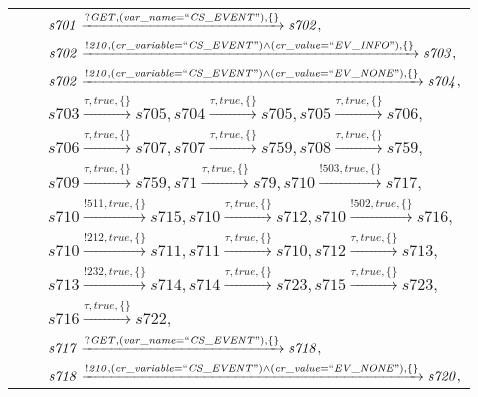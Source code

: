 \begin{tabular}{lcp{350px}}
& & $\mathit{s701}\xrightarrow{\mathit{?GET}, \mathit{(var\_name = ``CS\_EVENT")}, \{\}}\mathit{s702},$ \\
& & $\mathit{s702}\xrightarrow{\mathit{!210}, \mathit{(cr\_variable = ``CS\_EVENT") \land (cr\_value = ``EV\_INFO")}, \{\}}\mathit{s703},$ \\
& & $\mathit{s702}\xrightarrow{\mathit{!210}, \mathit{(cr\_variable = ``CS\_EVENT") \land (cr\_value = ``EV\_NONE")}, \{\}}\mathit{s704},$ \\
& & $\mathit{s703}\xrightarrow{\mathit{\tau}, \mathit{true}, \{\}}\mathit{s705},\mathit{s704}\xrightarrow{\mathit{\tau}, \mathit{true}, \{\}}\mathit{s705},\mathit{s705}\xrightarrow{\mathit{\tau}, \mathit{true}, \{\}}\mathit{s706},$ \\
& & $\mathit{s706}\xrightarrow{\mathit{\tau}, \mathit{true}, \{\}}\mathit{s707},\mathit{s707}\xrightarrow{\mathit{\tau}, \mathit{true}, \{\}}\mathit{s759},\mathit{s708}\xrightarrow{\mathit{\tau}, \mathit{true}, \{\}}\mathit{s759},$ \\
& & $\mathit{s709}\xrightarrow{\mathit{\tau}, \mathit{true}, \{\}}\mathit{s759},\mathit{s71}\xrightarrow{\mathit{\tau}, \mathit{true}, \{\}}\mathit{s79},\mathit{s710}\xrightarrow{\mathit{!503}, \mathit{true}, \{\}}\mathit{s717},$ \\
& & $\mathit{s710}\xrightarrow{\mathit{!511}, \mathit{true}, \{\}}\mathit{s715},\mathit{s710}\xrightarrow{\mathit{\tau}, \mathit{true}, \{\}}\mathit{s712},\mathit{s710}\xrightarrow{\mathit{!502}, \mathit{true}, \{\}}\mathit{s716},$ \\
& & $\mathit{s710}\xrightarrow{\mathit{!212}, \mathit{true}, \{\}}\mathit{s711},\mathit{s711}\xrightarrow{\mathit{\tau}, \mathit{true}, \{\}}\mathit{s710},\mathit{s712}\xrightarrow{\mathit{\tau}, \mathit{true}, \{\}}\mathit{s713},$ \\
& & $\mathit{s713}\xrightarrow{\mathit{!232}, \mathit{true}, \{\}}\mathit{s714},\mathit{s714}\xrightarrow{\mathit{\tau}, \mathit{true}, \{\}}\mathit{s723},\mathit{s715}\xrightarrow{\mathit{\tau}, \mathit{true}, \{\}}\mathit{s723},$ \\
& & $\mathit{s716}\xrightarrow{\mathit{\tau}, \mathit{true}, \{\}}\mathit{s722},$ \\
& & $\mathit{s717}\xrightarrow{\mathit{?GET}, \mathit{(var\_name = ``CS\_EVENT")}, \{\}}\mathit{s718},$ \\
& & $\mathit{s718}\xrightarrow{\mathit{!210}, \mathit{(cr\_variable = ``CS\_EVENT") \land (cr\_value = ``EV\_NONE")}, \{\}}\mathit{s720},$ \\

\end{tabular}
